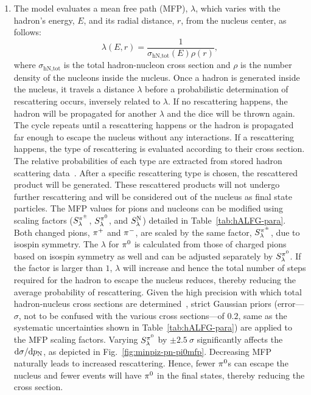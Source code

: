 \begin{enumerate}
    \item 
    The model evaluates a mean free path (MFP), $\lambda$, which varies with the hadron's energy, $E$, and its radial distance, $r$, from the nucleus center,  as follows:
    \begin{equation}
        \lambda(E,r) = \frac{1}{\sigma_\textrm{hN,tot}(E)\rho(r)},
    \end{equation}
    where $\sigma_\textrm{hN,tot}$ is the total hadron-nucleon cross section and $\rho$ is the number density of the nucleons inside the nucleus. Once a hadron is generated inside the nucleus, it travels a distance $\lambda$ before a probabilistic determination of rescattering occurs, inversely related to  $\lambda$. If no rescattering happens, the hadron will be propagated for another $\lambda$ and the dice will be thrown again. The cycle repeats until a rescattering happens or the hadron is propagated far enough to escape the nucleus without any interactions. If a rescattering happens, the type of rescattering is evaluated according to their cross section. The relative probabilities of each type are extracted from stored hadron scattering data~\cite{LADS:1999dyv,Navon:1983xj,Carroll:1976hj,Clough:1974qt,BAUHOFF1986429,Mashnik:2000up,Ishibashi:1997gbe}. After a specific rescattering type is chosen, the rescattered product will be generated. These rescattered products will not undergo further rescattering and will be considered out of the nucleus as final state particles.  
    The MFP values for pions and nucleons can be modified using scaling factors  ($S_\lambda^{\pi^{\pm}}$, $S_\lambda^{\pi^{0}}$,  and $S_\lambda^\textrm{N}$) detailed in Table~\ref{tab:hALFG-para}. Both changed pions, $\pi^+$ and $\pi^-$, are scaled by the same factor, $S_\lambda^{\pi^{\pm}}$, due to isospin symmetry. The $\lambda$ for $\pi^0$ is calculated from those of charged pions based on isospin symmetry as well and can be adjusted separately by $S_\lambda^{\pi^{0}}$. If the factor is larger than $1$, $\lambda$ will increase and hence the total number of steps required for the hadron to escape the nucleus reduces, thereby reducing the average probability of rescattering. 
    Given the high precision with which total hadron-nucleus cross sections are determined~\cite{LADS:1999dyv,Navon:1983xj,Carroll:1976hj,Clough:1974qt,BAUHOFF1986429}, strict Gaussian priors (error---$\sigma$, not to be confused with the various cross sections---of $0.2$, same as the systematic uncertainties shown in Table~\ref{tab:hALFG-para}) are applied to the MFP scaling factors. 
    Varying $S_\lambda^{\pi^{0}}$ by $\pm2.5~\sigma$ significantly affects the \minpiz $\textrm{d}\sigma/\textrm{d}p_\textrm{N}$, as depicted in Fig.~\ref{fig:minpiz-pn-pi0mfp}. Decreasing MFP naturally leads to increased rescattering. Hence, fewer $\pi^0$s can escape the nucleus and fewer events will have $\pi^0$ in the final states, thereby reducing the cross section. 


\end{enumerate}
